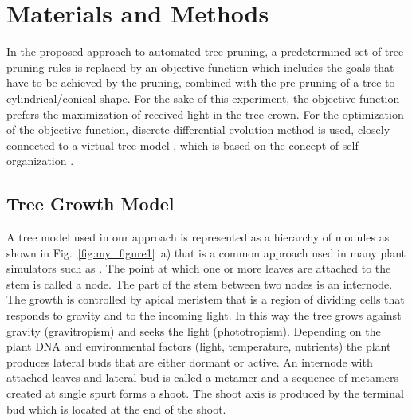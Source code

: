 \documentclass[1p]{elsarticle}
\begin{document}
\section{Materials and Methods}

In the proposed approach to automated tree pruning, a predetermined set
of tree pruning rules is replaced by an objective function which
includes the goals that have to be achieved by the pruning, combined
with the pre-pruning of a tree to cylindrical/conical shape. For the
sake of this experiment, the objective function prefers the maximization
of received light in the tree crown. For the optimization of the
objective function, discrete differential evolution method is used,
closely connected to a virtual tree model \cite{kohek_eduapple:_2015}, which is based on the
concept of self-organization \cite{palubicki_self-organizing_2009}.

\subsection{Tree Growth Model}

A tree model used in our approach is represented as a hierarchy of
modules as shown in Fig.~\ref{fig:my_figure1}~a) that is a common approach used in many plant
simulators such as \cite{de_reffye_plant_1988,palubicki_self-organizing_2009,pirk_plastic_2012,prusinkiewicz_development_1988,stava_inverse_2014}. The point at which one or more
leaves are attached to the stem is called a node. The part of the stem
between two nodes is an internode. The growth is controlled by apical
meristem that is a region of dividing cells that responds to gravity and
to the incoming light. In this way the tree grows against gravity
(gravitropism) and seeks the light (phototropism). Depending on the
plant DNA and environmental factors (light, temperature, nutrients) the
plant produces lateral buds that are either dormant or active. An
internode with attached leaves and lateral bud is called a metamer and a
sequence of metamers created at single spurt forms a shoot. The shoot
axis is produced by the terminal bud which is located at the end of the
shoot.
\end{document}
